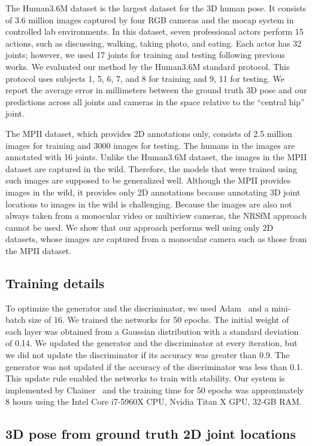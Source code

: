 \documentclass[runningheads]{llncs}
\begin{document}
The Human3.6M dataset is the largest dataset for the 3D human pose. It consists of 3.6 million images captured by four RGB cameras and the mocap system in controlled lab environments.
In this dataset, seven professional actors perform 15 actions, such as discussing, walking, taking photo, and eating.
Each actor has 32 joints; however, we used 17 joints for training and testing following previous works.
We evaluated our method by the Human3.6M standard protocol.
This protocol uses subjects 1, 5, 6, 7, and 8 for training and 9, 11 for testing.
We report the average error in millimeters between the ground truth 3D pose and our predictions across all joints and cameras in the space relative to the ``central hip'' joint.

The MPII dataset, which provides 2D annotations only, consists of 2.5 million images for training and 3000 images for testing.
The humans in the images are annotated with 16 joints.
Unlike the Human3.6M dataset, the images in the MPII dataset are captured in the wild.
Therefore, the models that were trained using such images are supposed to be generalized well.
Although the MPII provides images in the wild, it provides only 2D annotations because annotating 3D joint locations to images in the wild is challenging.
Because the images are also not always taken from a monocular video or multiview cameras, the NRSfM approach cannot be used.
We show that our approach performs well using only 2D datasets, whose images are captured from a monocular camera such as those from the MPII dataset.

\subsection{Training details}
To optimize the generator and the discriminator, we used Adam~\cite{adam} and a mini-batch size of 16.
We trained the networks for 50 epochs.
The initial weight of each layer was obtained from a Gaussian distribution with a standard deviation of 0.14.
We updated the generator and the discriminator at every iteration, but we did not update the discriminator if its accuracy was greater than 0.9.
The generator was not updated if the accuracy of the discriminator was less than 0.1.
This update rule enabled the networks to train with stability.
Our system is implemented by Chainer~\cite{chainer} and the training time for 50 epochs was approximately 8 hours using the Intel Core i7-5960X CPU, Nvidia Titan X GPU, 32-GB RAM.

\subsection{3D pose from ground truth 2D joint locations}
\end{document}
